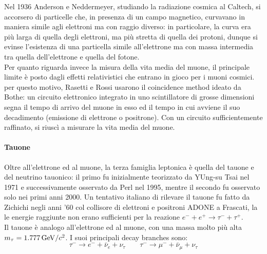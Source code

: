 Nel 1936 Anderson e Neddermeyer, studiando la radiazione cosmica al Caltech, si accorsero di particelle che, in presenza di un campo magnetico, curvavano in maniera simile agli elettroni ma con raggio diverso: in particolare, la curva era più larga di quella degli elettroni, ma più stretta di quella dei protoni, dunque si evinse l'esistenza di una particella simile all'elettrone ma con massa intermedia tra quella dell'elettrone e quella del fotone.\\
Per quanto riguarda invece la misura della vita media del muone, il principale limite è posto dagli effetti relativistici che entrano in gioco per i muoni cosmici. per questo motivo, Rasetti e Rossi usarono il coincidence method ideato da Bothe: un circuito elettronico integrato in uno scintillatore di grosse dimensioni segna il tempo di arrivo del muone in esso ed il tempo in cui avviene il suo decadimento (emissione di elettrone o positrone). Con un circuito sufficientemente raffinato, si riuscì a misurare la vita media del muone.

\paragraph{Tauone}

Oltre all'elettrone ed al muone, la terza famiglia leptonica è quella del tauone e del neutrino tauonico: il primo fu inizialmente teorizzato da YUng-su Tsai nel 1971 e successivamente osservato da Perl nel 1995, mentre il secondo fu osservato solo nei primi anni 2000. Un tentativo italiano di rilevare il tauone fu fatto da Zichichi negli anni '60 col collisore di elettroni e positroni ADONE a Frascati, la le energie raggiunte non erano sufficienti per la reazione $ e^- + e^+ \rightarrow \tau^- + \tau^+ $.\\
Il tauone è analogo all'elettrone ed al muone, con una massa molto più alta $ m_{\tau} = 1.777\,\mathrm{GeV}/c^2 $. I suoi principali decay branches sono:
\begin{equation*}
	\tau^- \rightarrow e^- + \bar{\nu}_e + \nu_{\tau}
	\qquad
	\tau^- \rightarrow \mu^- + \bar{\nu}_{\mu} + \nu_{\tau}
\end{equation*}










